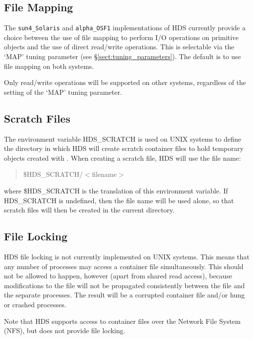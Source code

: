 \documentclass[twoside,11pt]{starlink}
\providecommand{\hi}[1]{{\texttt{#1}}}
\begin{document}
\subsection{\label{sect:system_map}File Mapping}

The \hi{sun4\_Solaris} and \hi{alpha\_OSF1} implementations of HDS
currently provide a choice between the use of file mapping to perform
I/O operations on primitive objects and the use of direct read/write
operations. This is selectable via the `MAP' tuning parameter (see
\S\ref{sect:tuning_parameters}). The default is to use file mapping on
both systems.

Only read/write operations will be supported on other systems,
regardless of the setting of the `MAP' tuning parameter.

\subsection{Scratch Files}

The environment variable HDS\_SCRATCH is used on UNIX systems to
define the directory in which HDS will create scratch container files
to hold temporary objects created with
. When creating a scratch file, HDS will
use the file name:

\begin{quote}
\$HDS\_SCRATCH/$<$filename$>$
\end{quote}

where \$HDS\_SCRATCH is the translation of this environment
variable. If HDS\_SCRATCH is undefined, then the file name will be
used alone, so that scratch files will then be created in the current
directory.

\subsection{File Locking}

HDS file locking is not currently implemented on UNIX systems. This
means that any number of processes may access a container file
simultaneously. This should not be allowed to happen, however (apart
from shared read access), because modifications to the file will not
be propagated consistently between the file and the separate
processes. The result will be a corrupted container file and/or hung
or crashed processes.

Note that HDS supports access to container files over the Network File
System (NFS), but does not provide file locking.
\end{document}
